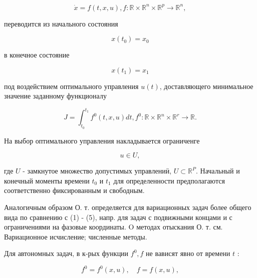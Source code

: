 \documentclass[10pt]{article}
\begin{document}
\[

\dot{x}=f(t, x, u), f: \mathbb{R} \times \mathbb{R}^{n} \times \mathbb{R}^{p} \longrightarrow \mathbb{R}^{n},

\]



переводится из начального состояния



\[

x\left(t_{0}\right)=x_{0}

\]



в конечное состояние



\[

x\left(t_{1}\right)=x_{1}

\]



под воздействием оптимального управления $u(t)$, доставляющего минимальное значение заданному функционалу



\[

J=\int_{t_{0}}^{t_{1}} f^{0}(t, x, u) d t, f^{0}: \mathbb{R} \times \mathbb{R}^{n} \times \mathbb{R}^{r} \longrightarrow \mathbb{R} .

\]



На выбор оптимального управления накладывается ограниченге



\[

u \in U,

\]



где $U$ - замкнутое множество допустимых управлениӥ, $U \subset \mathbb{R}^{P}$. Начальный и конечный моменты времени $t_{0}$ и $t_{1}$ для определенности предполагаются соответственно фиксированным и свободным.



Аналогичным образом О. т. определяется для вариационных задач более общего вида по сравнению с (1) - (5), напр. для задач с подвижными концами и с ограничениями на фазовые координаты. $\mathrm{O}$ методах отыскания О. т. см. Вариационное исчисление; численные методы.



Для автономных задач, в к-рых функции $f^{0}, f$ не вависят явно от времени $t$ :



\[

f^{0}=f^{0}(x, u), \quad f=f(x, u),

\]
\end{document}
